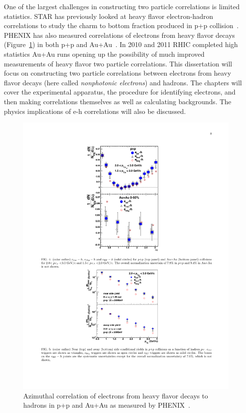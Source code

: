 One of the largest challenges in constructing two particle correlations is limited statistics. STAR has previously looked at heavy flavor electron-hadron correlations to study the charm to bottom fraction produced in p+p collision~\cite{STARBDrat}. PHENIX has also measured correlations of electrons from heavy flavor decays (Figure~\ref{fig:phenix_eh}) in both p+p and Au+Au~\cite{PHENIXeh}. In 2010 and 2011 RHIC completed high statistics Au+Au runs opening up the possibility of much improved measurements of heavy flavor two particle correlations. This dissertation will focus on constructing two particle correlations between electrons from heavy flavor decays (here called \textit{nonphotonic electrons}) and hadrons. The chapters will cover the experimental apparatus, the procedure for identifying electrons, and then making correlations themselves as well as calculating backgrounds. The physics implications of e-h correlations will also be discussed. 

\begin{figure}[htbp]
\begin{center}
\includegraphics[scale=1.3]{Plots/Intro/phenix_eh.pdf}
\end{center}
\caption[PHENIX e-h correlation]{Azimuthal correlation of electrons from heavy flavor decays to hadrons in p+p and Au+Au as measured by PHENIX~\cite{PHENIXeh}.}
\label{fig:phenix_eh}
\end{figure}
